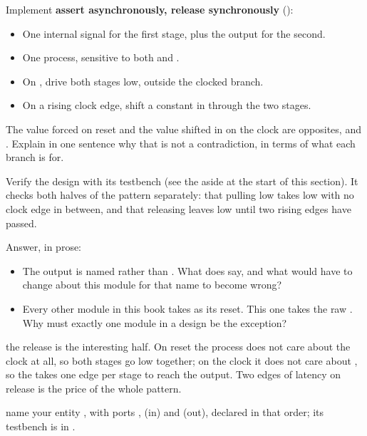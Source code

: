 \begin{parts}
  \item Implement \textbf{assert asynchronously, release synchronously} ():
    \begin{itemize}
      \item One internal signal for the first stage, plus the output for the second.
      \item One process, sensitive to both  and .
      \item On , drive both stages low, outside the clocked branch.
      \item On a rising clock edge, shift a constant  in through the two stages.
    \end{itemize}
  \item The value forced on reset and the value shifted in on the clock are opposites, 
    and . Explain in one sentence why that is not a contradiction, in terms of what each
    branch is for.
  \item Verify the design with its testbench (see the aside at the start of this section). It checks
    both halves of the pattern separately: that pulling  low takes 
    low with no clock edge in between, and that releasing  leaves 
    low until two rising edges have passed.
  \item Answer, in prose:
    \begin{itemize}
      \item The output is named  rather than . What does
         say, and what would have to change about this module for that name to become
        wrong?
      \item Every other module in this book takes  as its reset. This one takes
        the raw . Why must exactly one module in a design be the exception?
    \end{itemize}
\end{parts}
\note[Tip] the release is the interesting half. On reset the process does not care about the clock
at all, so both stages go low together; on the clock it does not care about , so the
 takes one edge per stage to reach the output. Two edges of latency on release is the
price of the whole pattern.


\selfcheck name your entity , with ports ,  (in) and
 (out), declared in that order; its testbench is in .

